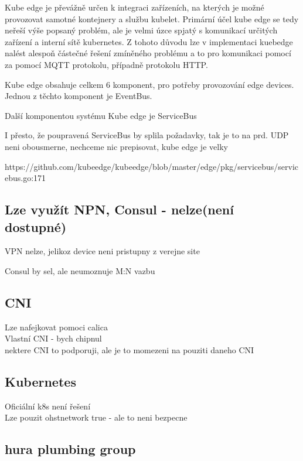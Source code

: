 Kube edge je převážně určen k integraci zařízeních, na kterých je možné provozovat samotné kontejnery a službu kubelet. Primární účel kube edge se tedy neřeší výše popsaný problém, ale je velmi úzce spjatý s komunikací určitých zařízení a interní sítě kubernetes. Z tohoto důvodu lze v implementaci kuebedge nalést alespoň částečné řešení zmíněného problému a to pro komunikaci pomocí za pomocí MQTT protokolu, případně protokolu HTTP.

Kube edge obsahuje celkem 6 komponent, pro potřeby provozování edge devices. Jednou z těchto komponent je EventBus.

Další komponentou  systému Kube edge je ServiceBus

I přesto, že poupravená ServiceBus by splila požadavky, tak je to na prd. UDP neni obousmerne, nechceme nic prepisovat, kube edge je velky

https://github.com/kubeedge/kubeedge/blob/master/edge/pkg/servicebus/servicebus.go:171

\subsection{Lze využít NPN, Consul - nelze(není dostupné)}
VPN nelze, jelikoz device neni pristupny z verejne site

Consul by sel, ale neumoznuje M:N vazbu



\subsection{CNI}
Lze nafejkovat pomoci calica\\
Vlastní CNI - bych chipnul\\
nektere CNI to podporuji, ale je to momezeni na pouziti daneho CNI

\subsection{Kubernetes}
Oficiální k8s není řešení\\
Lze pouzit ohstnetwork true - ale to neni bezpecne\\







\subsection{hura plumbing group}

